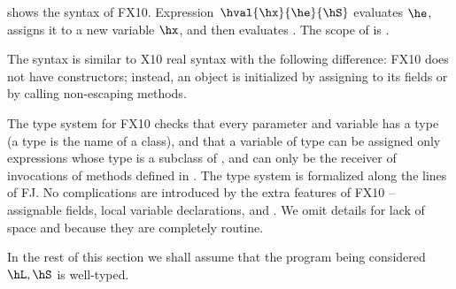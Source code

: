  shows the syntax of FX10.
Expression~$\hval{\hx}{\he}{\hS}$ evaluates $\he$, assigns it to a
new variable $\hx$, and then evaluates \hS. The scope of \he{} is \hS.

The syntax is similar to X10 real syntax with the following difference:
FX10 does not have constructors; instead, an object is initialized by assigning to its fields or
    by calling
    non-escaping methods.



The type system for FX10 checks that every parameter and variable has
a type (a type is the name of a class), and that a variable of type
\hC can be assigned only expressions whose type is a subclass of \hC,
and can only be the receiver of invocations of methods defined in
\hC. The type system is formalized along the lines of FJ. No
complications are introduced by the extra features of FX10 --
assignable fields, local variable declarations, \hfinish{} and
\hasync{}. We omit details for lack of space and because they are
completely routine.

In the rest of this section we shall assume that the program being
considered $\hL,\hS$ is well-typed.

